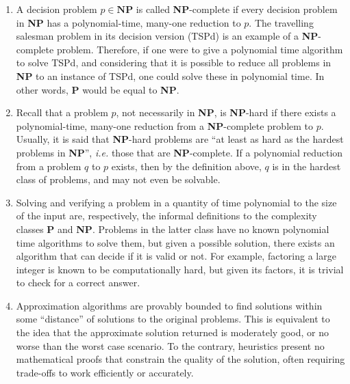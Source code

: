 \documentclass[12pt]{article}
\begin{document}
\begin{enumerate}
\begin{enumerate}
    \item A decision problem $p \in \mathbf{NP}$ is called \textbf{NP}-complete if every decision problem in \textbf{NP} has a polynomial-time, many-one reduction to $p$. The travelling salesman problem in its decision version (TSPd) is an example of a \textbf{NP}-complete problem. Therefore, if one were to give a polynomial time algorithm to solve TSPd, and considering that it is possible to reduce all problems in \textbf{NP} to an instance of TSPd, one could solve these in polynomial time. In other words, \textbf{P} would be equal to \textbf{NP}.
    \item Recall that a problem $p$, not necessarily in \textbf{NP}, is \textbf{NP}-hard if there exists a polynomial-time, many-one reduction from a \textbf{NP}-complete problem to $p$. Usually, it is said that \textbf{NP}-hard problems are ``at least as hard as the hardest problems in \textbf{NP}'', \emph{i.e.} those that are \textbf{NP}-complete. If a polynomial reduction from a problem $q$ to $p$ exists, then by the definition above, $q$ is in the hardest class of problems, and may not even be solvable.
    \item Solving and verifying a problem in a quantity of time polynomial to the size of the input are, respectively, the informal definitions to the complexity classes \textbf{P} and \textbf{NP}. Problems in the latter class have no known polynomial time algorithms to solve them, but given a possible solution, there exists an algorithm that can decide if it is valid or not. For example, factoring a large integer is known to be computationally hard, but given its factors, it is trivial to check for a correct answer.
    \item Approximation algorithms are provably bounded to find solutions within some ``distance'' of solutions to the original problems. This is equivalent to the idea that the approximate solution returned is moderately good, or no worse than the worst case scenario. To the contrary, heuristics present no mathematical proofs that constrain the quality of the solution, often requiring trade-offs to work efficiently or accurately.
  \end{enumerate}
\end{enumerate}
\end{document}
